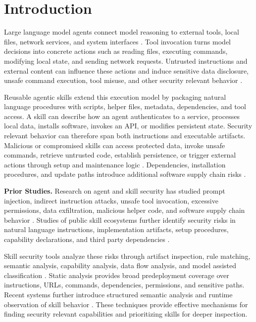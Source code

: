 \section{Introduction}

Large language model agents connect model reasoning to external tools, local
files, network services, and system interfaces
\cite{yao2023react,schick2023toolformer,shen2023hugginggpt}. Tool invocation
turns model decisions into concrete actions such as reading files, executing
commands, modifying local state, and sending network requests. Untrusted
instructions and external content can influence these actions and induce
sensitive data disclosure, unsafe command execution, tool misuse, and other
security relevant behavior
\cite{liu2024promptinjection,greshake2023notwhat,injecagent2024,
debenedetti2024agentdojo,ipiguard2025,wang2025agentarmor}.

Reusable agentic skills extend this execution model by packaging natural
language procedures with scripts, helper files, metadata, dependencies, and
tool access. A skill can describe how an agent authenticates to a service,
processes local data, installs software, invokes an API, or modifies persistent
state. Security relevant behavior can therefore span both instructions and
executable artifacts. Malicious or compromised skills can access protected
data, invoke unsafe commands, retrieve untrusted code, establish persistence,
or trigger external actions through setup and maintenance logic
\cite{skillscan2026,skillfortify2026,agentaudit2026,wen2026semia}.
Dependencies, installation procedures, and update paths introduce additional
software supply chain risks
\cite{ohm2020backstabber,zimmermann2019smallworld,
duan2020packagemanager,torresarias2019intoto}.

\noindent
\textbf{Prior Studies.}
Research on agent and skill security has studied prompt injection, indirect
instruction attacks, unsafe tool invocation, excessive permissions, data
exfiltration, malicious helper code, and software supply chain behavior
\cite{liu2024promptinjection,greshake2023notwhat,injecagent2024,
debenedetti2024agentdojo,ipiguard2025,wang2025agentarmor,
skillscan2026,skillfortify2026,agentaudit2026}. Studies of public skill
ecosystems further identify security risks in natural language instructions,
implementation artifacts, setup procedures, capability declarations, and
third party dependencies \cite{skillscan2026,wen2026semia,
liu2026maliciousskillswild}.

Skill security tools analyze these risks through artifact inspection, rule
matching, semantic analysis, capability analysis, data flow analysis, and
model assisted classification
\cite{skillscan2026,skillfortify2026,agentaudit2026,
ciscoSkillScanner2026,wen2026semia}. Static analysis provides broad
predeployment coverage over instructions, URLs, commands, dependencies,
permissions, and sensitive paths. Recent systems further introduce structured
semantic analysis and runtime observation of skill behavior
\cite{wen2026semia,ji2026cloakdetonate}. These techniques provide effective
mechanisms for finding security relevant capabilities and prioritizing skills
for deeper inspection.

